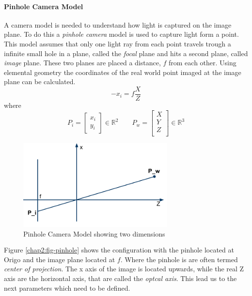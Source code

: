 \paragraph{Pinhole Camera Model}
A camera model is needed to understand how light is captured on the image plane. To do
this a \emph{pinhole camera} model is used to capture light form a point. This model
assumes that only one light ray from each point travels trough a infinite small hole in
a plane, called the \emph{focal} plane and hits a second plane, called \emph{image} plane.
These two planes are placed a distance, $f$ from each other. Using elemental geometry the
coordinates of the real world point imaged at the image plane can be calculated. 
\begin{equation}
    -x_i = f \frac{X}{Z}
\end{equation}
where
\begin{equation}
    P_i = \left [ \begin{array}{c}
        x_i \\
        y_i 
    \end{array} \right]  \in \mathbb{R}^2 \quad \quad P_w = \left [
    \begin{array}{c}
        X \\
        Y \\
        Z \\ 
    \end{array} \right] \in \mathbb{R}^3 
\end{equation}
\begin{figure}[hbtp]
    \centering
    \includegraphics[width=0.7\textwidth]{pics/pinhole_model}
    \caption{Pinhole Camera Model showing two dimensions}
    \label{fig:ch2-pinhole}
\end{figure}

Figure \ref{chap2:fig-pinhole} shows the configuration with the pinhole located at
Origo and the image plane located at $f$. Where the pinhole is are often termed
\emph{center of projection}. The x axis of the image is located
upwards, while the real Z axis are the horizontal axis, that are called the
\emph{optcal axis}. This lead us to the next parameters which need to be defined.

